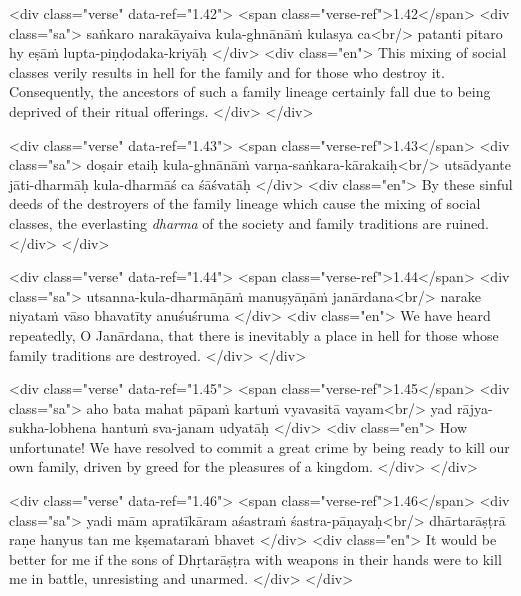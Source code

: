 \begin{html}
<div class="verse" data-ref="1.42">
  <span class="verse-ref">1.42</span>
  <div class="sa">
    saṅkaro narakāyaiva kula-ghnānāṁ kulasya ca<br/>
    patanti pitaro hy eṣāṁ lupta-piṇḍodaka-kriyāḥ
  </div>
  <div class="en">
    This mixing of social classes verily results in hell for the family and for those who destroy it. Consequently, the ancestors of such a family lineage certainly fall due to being deprived of their ritual offerings.
  </div>
</div>
\end{html}



\begin{html}
<div class="verse" data-ref="1.43">
  <span class="verse-ref">1.43</span>
  <div class="sa">
    doṣair etaiḥ kula-ghnānāṁ varṇa-saṅkara-kārakaiḥ<br/>
    utsādyante jāti-dharmāḥ kula-dharmāś ca śāśvatāḥ
  </div>
  <div class="en">
    By these sinful deeds of the destroyers of the family lineage which cause the mixing of social classes, the everlasting \textit{dharma} of the society and family traditions are ruined.
  </div>
</div>
\end{html}



\begin{html}
<div class="verse" data-ref="1.44">
  <span class="verse-ref">1.44</span>
  <div class="sa">
    utsanna-kula-dharmāṇāṁ manuṣyāṇāṁ janārdana<br/>
    narake niyataṁ vāso bhavatīty anuśuśruma
  </div>
  <div class="en">
    We have heard repeatedly, O Janārdana, that there is inevitably a place in hell for those whose family traditions are destroyed.
  </div>
</div>
\end{html}



\begin{html}
<div class="verse" data-ref="1.45">
  <span class="verse-ref">1.45</span>
  <div class="sa">
    aho bata mahat pāpaṁ kartuṁ vyavasitā vayam<br/>
    yad rājya-sukha-lobhena hantuṁ sva-janam udyatāḥ
  </div>
  <div class="en">
    How unfortunate! We have resolved to commit a great crime by being ready to kill our own family, driven by greed for the pleasures of a kingdom.
  </div>
</div>
\end{html}



\begin{html}
<div class="verse" data-ref="1.46">
  <span class="verse-ref">1.46</span>
  <div class="sa">
    yadi mām apratīkāram aśastraṁ śastra-pāṇayaḥ<br/>
    dhārtarāṣṭrā raṇe hanyus tan me kṣemataraṁ bhavet
  </div>
  <div class="en">
    It would be better for me if the sons of Dhṛtarāṣṭra with weapons in their hands were to kill me in battle, unresisting and unarmed.
  </div>
</div>
\end{html}




